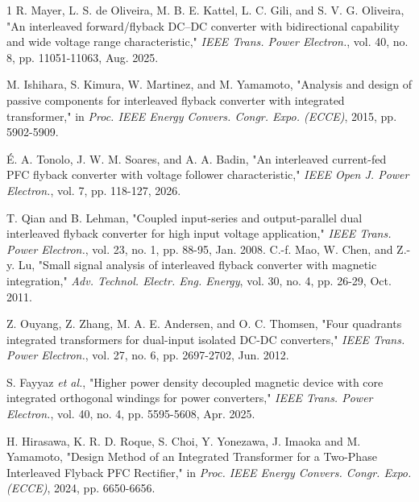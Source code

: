 \documentclass[lettersize,journal]{IEEEtran}
\begin{document}
\begin{thebibliography}{1}
{\color{red}
R. Mayer, L. S. de Oliveira, M. B. E. Kattel, L. C. Gili, and S. V. G. Oliveira, "An interleaved forward/flyback DC–DC converter with bidirectional capability and wide voltage range characteristic," \textit{IEEE Trans. Power Electron.}, vol. 40, no. 8, pp. 11051-11063, Aug. 2025.}

{\color{red}
M. Ishihara, S. Kimura, W. Martinez, and M. Yamamoto, "Analysis and design of passive components for interleaved flyback converter with integrated transformer," in \textit{Proc. IEEE Energy Convers. Congr. Expo. (ECCE)}, 2015, pp. 5902-5909.}

{\color{red}
É. A. Tonolo, J. W. M. Soares, and A. A. Badin, "An interleaved current-fed PFC flyback converter with voltage follower characteristic," \textit{IEEE Open J. Power Electron.}, vol. 7, pp. 118-127, 2026.}

{\color{red}
T. Qian and B. Lehman, "Coupled input-series and output-parallel dual interleaved flyback converter for high input voltage application," \textit{IEEE Trans. Power Electron.}, vol. 23, no. 1, pp. 88-95, Jan. 2008.
}
{\color{red}
C.-f. Mao, W. Chen, and Z.-y. Lu, "Small signal analysis of interleaved flyback converter with magnetic integration," \textit{Adv. Technol. Electr. Eng. Energy}, vol. 30, no. 4, pp. 26-29, Oct. 2011.}


Z. Ouyang, Z. Zhang, M. A. E. Andersen, and O. C. Thomsen, "Four quadrants integrated transformers for dual-input isolated DC-DC converters," \textit{IEEE Trans. Power Electron.}, vol. 27, no. 6, pp. 2697-2702, Jun. 2012.

{\color{red}
S. Fayyaz \textit{et al.}, "Higher power density decoupled magnetic device with core integrated orthogonal windings for power converters," \textit{IEEE Trans. Power Electron.}, vol. 40, no. 4, pp. 5595-5608, Apr. 2025.}


H. Hirasawa, K. R. D. Roque, S. Choi, Y. Yonezawa, J. Imaoka and M. Yamamoto, "Design Method of an Integrated Transformer for a Two-Phase Interleaved Flyback PFC Rectifier," in \textit{Proc. IEEE Energy Convers. Congr. Expo. (ECCE)}, 2024, pp. 6650-6656.


\end{thebibliography}
\end{document}
